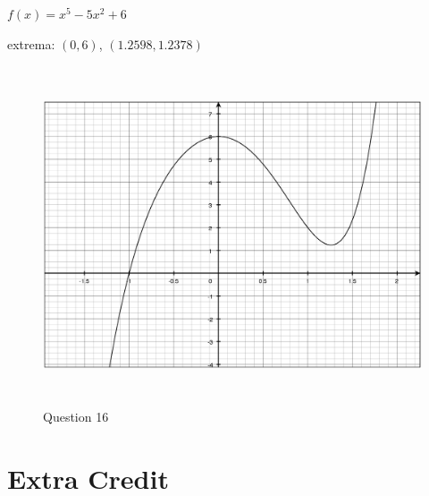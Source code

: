 \documentclass[fleqn,addpoints]{exam}
\begin{document}
\begin{questions}
\begin{solution}
\end{solution}

\ifprintanswers
\else
\pagebreak
\fi

\question \label{calculator:last} $f(x) = x^5-5x^2+6$
\begin{solution}
extrema: $(0, 6)$, $(1.2598, 1.2378)$
\begin{figure}[H]
  \centering
  \includegraphics[width=14cm,height=10cm]{question_16.eps}
  \caption*{Question 16}
\end{figure}

\end{solution}

\end{questions}

\section{Extra Credit}
\end{document}
